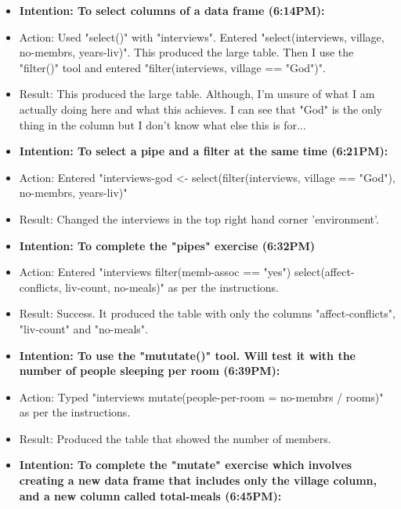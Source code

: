 \documentclass[a4paper,12pt]{article}
\begin{document}
\begin{itemize}
\item \textbf{Intention: To select columns of a data frame (6:14PM):}


\item Action: Used "select()" with "interviews". Entered "select(interviews, village, no-membrs, years-liv)". This produced the large table. Then I use the "filter()" tool and entered "filter(interviews, village == "God")".


\item Result: This produced the large table. Although, I'm unsure of what I am actually doing here and what this achieves. I can see that "God" is the only thing in the column but I don't know what else this is for...


\item \textbf{Intention: To select a pipe and a filter at the same time (6:21PM):}


\item Action: Entered "interviews-god <- select(filter(interviews, village == "God"), no-membrs, years-liv)"


\item Result: Changed the interviews in the top right hand corner 'environment'. 


\item \textbf{Intention: To complete the "pipes" exercise (6:32PM)}


\item Action: Entered "interviews %
    filter(memb-assoc == "yes") %
    select(affect-conflicts, liv-count, no-meals)" as per the instructions. 
    

\item Result: Success. It produced the table with only the columns "affect-conflicts", "liv-count" and "no-meals".


\item \textbf{Intention: To use the "mututate()" tool. Will test it with the number of people sleeping per room (6:39PM):}


\item Action: Typed "interviews %
    mutate(people-per-room = no-membrs / rooms)" as per the instructions. 
    
    
\item Result: Produced the table that showed the number of members. 


\item \textbf{Intention: To complete the "mutate" exercise which involves creating a new data frame that includes only the village column, and a new column called total-meals (6:45PM):}



\end{itemize}
\end{document}
